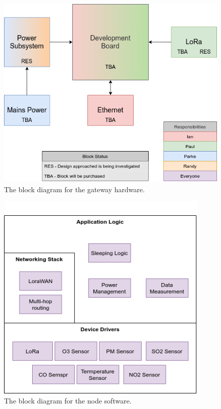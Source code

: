\begin{figure}[H]
    \centering
    \includegraphics[width=5.3in]{"./figures/hwGatewayBD.png"} 
    \caption{The block diagram for the gateway hardware.}
    \label{fig:hwBaseStationBD}
\end{figure}

\begin{figure}[H]
    \centering
    \includegraphics[width=4in]{"./figures/swNodeBD.png"} 
    \caption{The block diagram for the node software.}
    \label{fig:swNodeBD}
\end{figure}




